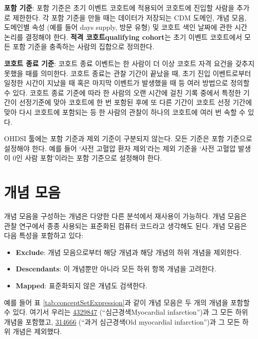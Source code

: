 \documentclass[10.5pt]{book}
\providecommand{\tightlist}{%
  \setlength{\itemsep}{0pt}\setlength{\parskip}{0pt}}
\theoremstyle{definition}
\theoremstyle{definition}
\theoremstyle{definition}
\theoremstyle{remark}
\let\BeginKnitrBlock\begin \let\EndKnitrBlock\end
\begin{document}
\textbf{포함 기준}: 포함 기준은 초기 이벤트 코호트에 적용되어 코호트에
진입할 사람을 추가로 제한한다. 각 포함 기준을 만들 때는 데이터가
저장되는 CDM 도메인, 개념 모음, 도메인별 속성 (예를 들어 days supply,
방문 유형) 및 코호트 색인 날짜에 관한 시간 논리를 결정해야 한다.
\textbf{적격 코호트qualifying cohort}는 초기 이벤트 코호트에서 모든 포함
기준을 충족하는 사람의 집합으로 정의한다.

\textbf{코호트 종료 기준}: 코호트 종료 이벤트는 한 사람이 더 이상 코호트
자격 요건을 갖추지 못했을 때를 의미한다. 코호트 종료는 관찰 기간이
끝났을 때, 초기 진입 이벤트로부터 일정한 시간이 지났을 때 혹은 마지막
이벤트가 발생했을 때 등 여러 방법으로 정의할 수 있다. 코호트 종료 기준에
따라 한 사람의 오랜 시간에 걸친 기록 중에서 특정한 기간이 선정기준에
맞아 코호트에 한 번 포함된 후에 또 다른 기간이 코호트 선정 기간에 맞아
다시 코호트에 포함되는 등 한 사람의 관찰이 하나의 코호트에 여러 번 속할
수 있다.

\BeginKnitrBlock{rmdimportant}
OHDSI 툴에는 포함 기준과 제외 기준이 구분되지 않는다. 모든 기준은 포함
기준으로 설정해야 한다. 예를 들어 `사전 고혈압 환자 제외'라는 제외
기준을 `사전 고혈압 발생이 0인 사람 포함'이라는 포함 기준으로 설정해야
한다.
\EndKnitrBlock{rmdimportant}

\section{개념 모음}\label{conceptSets}


개념 모음을 구성하는 개념은 다양한 다른 분석에서 재사용이 가능하다. 개념
모음은 관찰 연구에서 종종 사용되는 표준화된 컴퓨터 코드라고 생각해도
된다. 개념 모음은 다음 특성을 포함하고 있다:

\begin{itemize}
\tightlist
\item
  \textbf{Exclude}: 개념 모음으로부터 해당 개념과 해당 개념의 하위
  개념을 제외한다.
\item
  \textbf{Descendants}: 이 개념뿐만 아니라 모든 하위 항목 개념을
  고려한다.
\item
  \textbf{Mapped}: 표준화되지 않은 개념도 검색한다.
\end{itemize}

예를 들어 표 \ref{tab:conceptSetExpression}과 같이 개념 모음은 두 개의
개념을 포함할 수 있다. 여기서 우리는
\href{http://athena.ohdsi.org/search-terms/terms/4329847}{4329847}
(``심근경색Myocardial infarction'')과 그 모든 하위 개념을 포함했고,
\href{http://athena.ohdsi.org/search-terms/terms/314666}{314666} (``과거
심근경색Old myocardial infarction'')과 그 모든 하위 개념은 제외했다.
\end{document}
